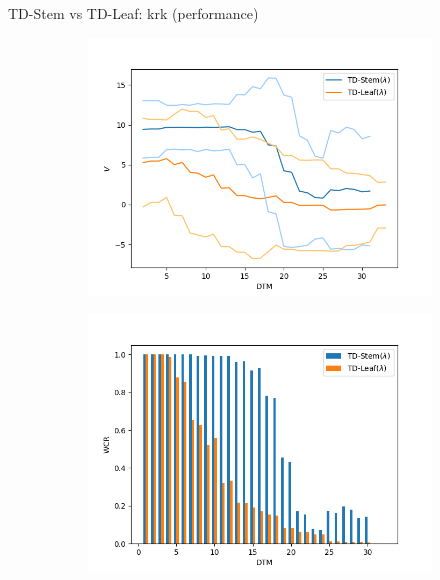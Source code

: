 \documentclass{beamer}
\begin{document}
\begin{frame}{TD-Stem vs TD-Leaf: krk (performance)}
	\begin{figure}
		\begin{subfigure}{0.4\textwidth}
			\includegraphics[scale=0.25]{fig/plots/krk_vf}
		\end{subfigure}
		\begin{subfigure}{0.4\textwidth}
			\includegraphics[scale=0.25]{fig/plots/krk_wcr}
		\end{subfigure}
		\begin{subfigure}{0.4\textwidth}

\end{subfigure}
\end{figure}
\end{frame}
\end{document}
